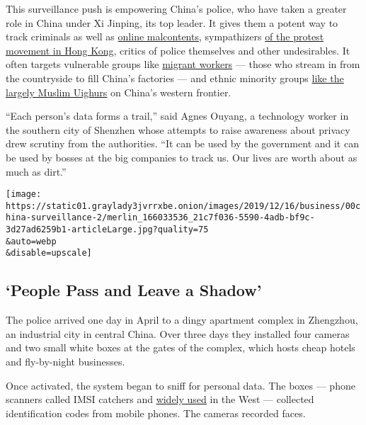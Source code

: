 This surveillance push is empowering China's police, who have taken a
greater role in China under Xi Jinping, its top leader. It gives them a
potent way to track criminals as well as
\href{https://www.nytimes3xbfgragh.onion/2018/02/28/world/asia/china-censorship-xi-jinping.html}{online
malcontents}, sympathizers
\href{https://www.nytimes3xbfgragh.onion/2019/06/13/world/asia/hong-kong-xi-jinping-china.html}{of
the protest movement in Hong Kong}, critics of police themselves and
other undesirables. It often targets vulnerable groups like
\href{https://www.nytimes3xbfgragh.onion/2017/11/30/world/asia/china-beijing-migrants.html}{migrant
workers} --- those who stream in from the countryside to fill China's
factories --- and ethnic minority groups
\href{https://www.nytimes3xbfgragh.onion/interactive/2019/11/16/world/asia/china-xinjiang-documents.html}{like
the largely Muslim Uighurs} on China's western frontier.

``Each person's data forms a trail,'' said Agnes Ouyang, a technology
worker in the southern city of Shenzhen whose attempts to raise
awareness about privacy drew scrutiny from the authorities. ``It can be
used by the government and it can be used by bosses at the big companies
to track us. Our lives are worth about as much as dirt.''

\texttt{[image: https://static01.graylady3jvrrxbe.onion/images/2019/12/16/business/00china-surveillance-2/merlin\_166033536\_21c7f036-5590-4adb-bf9c-3d27ad6259b1-articleLarge.jpg?quality=75\\\&auto=webp\\\&disable=upscale]}

\hypertarget{people-pass-and-leave-a-shadow}{%
\subsection{`People Pass and Leave a
Shadow'}\label{people-pass-and-leave-a-shadow}}

The police arrived one day in April to a dingy apartment complex in
Zhengzhou, an industrial city in central China. Over three days they
installed four cameras and two small white boxes at the gates of the
complex, which hosts cheap hotels and fly-by-night businesses.

Once activated, the system began to sniff for personal data. The boxes
--- phone scanners called IMSI catchers and
\href{https://www.nytimes3xbfgragh.onion/2016/02/12/nyregion/new-york-police-dept-cellphone-tracking-stingrays.html}{widely
used} in the West --- collected identification codes from mobile phones.
The cameras recorded faces.

